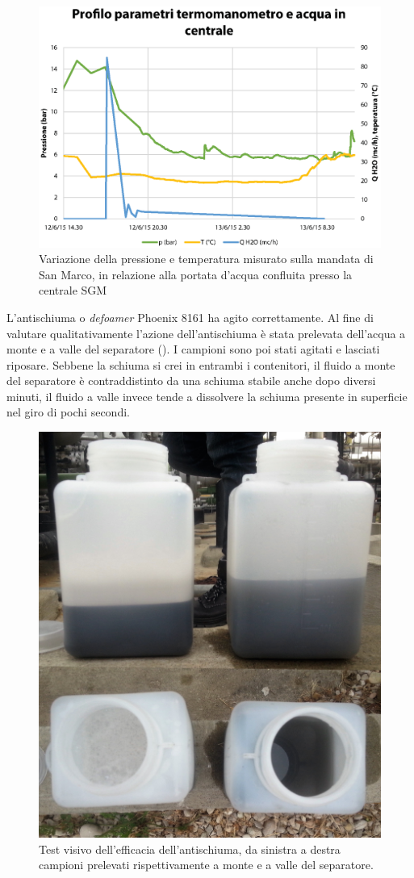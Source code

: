 \begin{figure}[htbp]
    \centering
    \includegraphics[width=\textwidth]{fig/test/graphs/profili.eps}
    \caption{Variazione della pressione e temperatura misurato sulla mandata di San Marco, in relazione alla portata d'acqua confluita presso la centrale SGM} 
    \label{fig:test-profili}
\end{figure}

L’antischiuma o \textit{defoamer} Phoenix 8161 ha agito correttamente. Al fine di valutare qualitativamente l’azione dell'antischiuma è stata prelevata dell'acqua a monte e a valle del separatore (). I campioni sono poi stati agitati e lasciati riposare. Sebbene la schiuma si crei in entrambi i contenitori, il fluido a monte del separatore è contraddistinto da una schiuma stabile anche dopo diversi minuti, il fluido a valle invece tende a dissolvere la schiuma presente in superficie nel giro di pochi secondi.

\begin{figure}[htbp]
    \centering
    \includegraphics[width=.5\textwidth]{fig/test/defoamer-confronto}
    \caption{Test visivo dell'efficacia dell'antischiuma, da sinistra a destra campioni prelevati rispettivamente a monte e a valle del separatore.} 
    \label{fig:defoamer-confronto}
\end{figure}

